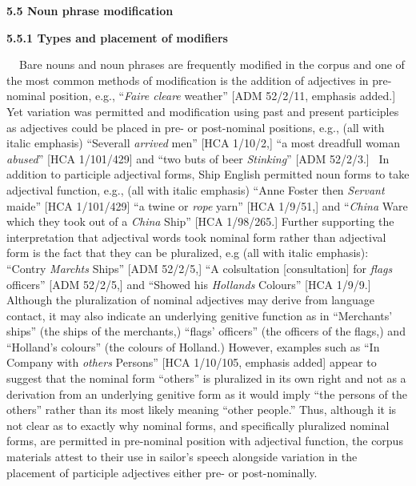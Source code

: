 \begin{styleStandard}
\textbf{5.5 Noun phrase modification }
\end{styleStandard}

\begin{styleStandard}
\textbf{5.5.1 Types and placement of modifiers}
\end{styleStandard}

\begin{styleStandard}
\textbf{\ \ }Bare nouns and noun phrases are frequently modified in the corpus and one of the most common methods of modification is the addition of adjectives in pre-nominal position, e.g., “\textit{Faire cleare} weather” [ADM 52/2/11, emphasis added.] Yet variation was permitted and modification using past and present participles as adjectives could be placed in pre- or post-nominal positions, e.g., (all with italic emphasis) “Severall \textit{arrived} men” [HCA 1/10/2,] “a most dreadfull woman \textit{abused}” [HCA 1/101/429] and “two buts of beer \textit{Stinking}” [ADM 52/2/3.] \ In addition to participle adjectival forms, Ship English permitted noun forms to take adjectival function, e.g., (all with italic emphasis) “Anne Foster then \textit{Servant} maide” [HCA 1/101/429] “a twine or \textit{rope} yarn” [HCA 1/9/51,] and “\textit{China }Ware which they took out of a \textit{China} Ship” [HCA 1/98/265.] Further supporting the interpretation that adjectival words took nominal form rather than adjectival form is the fact that they can be pluralized, e.g (all with italic emphasis): “Contry \textit{Marchts} Ships” [ADM 52/2/5,] “A colsultation [consultation] for\textit{ flags} officers” [ADM 52/2/5,] and “Showed his \textit{Hollands} Colours” [HCA 1/9/9.] Although the pluralization of nominal adjectives may derive from language contact, it may also indicate an underlying genitive function as in “Merchants’ ships” (the ships of the merchants,) “flags’ officers” (the officers of the flags,) and “Holland’s colours” (the colours of Holland.) However, examples such as “In Company with\textit{ others} Persons” [HCA 1/10/105, emphasis added] appear to suggest that the nominal form “others” is pluralized in its own right and not as a derivation from an underlying genitive form as it would imply “the persons of the others” rather than its most likely meaning “other people.” Thus, although it is not clear as to exactly why nominal forms, and specifically pluralized nominal forms, are permitted in pre-nominal position with adjectival function, the corpus materials attest to their use in sailor’s speech alongside variation in the placement of participle adjectives either pre- or post-nominally. 
\end{styleStandard}

